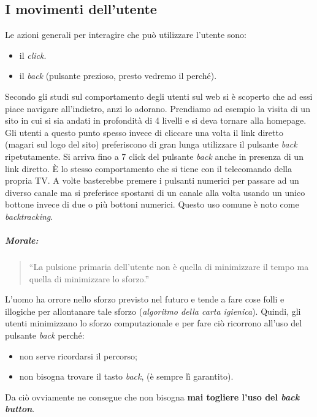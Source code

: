 		\subsection{I movimenti dell'utente}
			Le azioni generali per interagire che può utilizzare l'utente sono:
			\begin{itemize}
				\item il \emph{click}.
				\item il \emph{back} (pulsante prezioso, presto vedremo il perché).
			\end{itemize}
			Secondo gli studi sul comportamento degli utenti sul web si è scoperto che ad essi piace navigare all'indietro, anzi lo adorano. Prendiamo ad esempio la visita di un sito in cui si sia andati in profondità di 4 livelli e si deva tornare alla homepage. Gli utenti a questo punto spesso invece di cliccare una volta  il link diretto (magari sul logo del sito) preferiscono di gran lunga utilizzare il pulsante \emph{back} ripetutamente.
			Si arriva fino a 7 click del pulsante \emph{back} anche in presenza di un link diretto. È lo stesso comportamento che si tiene con il telecomando della propria TV. A volte basterebbe premere i pulsanti numerici per passare ad un diverso canale ma si preferisce spostarsi di un canale alla volta usando un unico bottone invece di due o più bottoni numerici. Questo uso comune è noto come \emph{backtracking}.
			\subparagraph*{Morale:}
			\begin{quote}
				``La pulsione primaria dell'utente non è quella di minimizzare il tempo ma quella di minimizzare lo sforzo.''
			\end{quote}
			L'uomo ha orrore nello sforzo previsto nel futuro e tende a fare cose folli e illogiche per allontanare tale sforzo (\emph{algoritmo della carta igienica}). Quindi, gli utenti minimizzano lo sforzo computazionale e per fare ciò ricorrono all'uso del pulsante \emph{back} perché:
			\begin{itemize}
				\item non serve ricordarsi il percorso;
				\item non bisogna trovare il tasto \emph{back}, (è sempre lì garantito).
			\end{itemize}
			Da ciò ovviamente ne consegue che non bisogna \textbf{mai togliere l'uso del \emph{back button}}.
			

